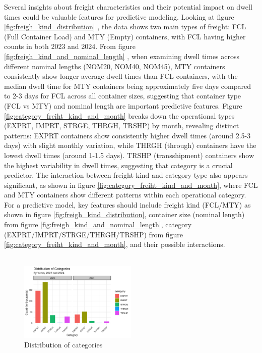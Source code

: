 			Several insights about freight characteristics and their potential impact on dwell times could be valuable
			features for predictive modeling. Looking at figure \ref{fig:freigh_kind_distribution}
			, the data shows two main types of freight: FCL (Full Container Load) and MTY (Empty) containers, with FCL
			having higher counts in both 2023 and 2024.
			From figure \ref{fig:freigh_kind_and_nominal_length}
			, when examining dwell times across different nominal lengths (NOM20, NOM40, NOM45), MTY containers
			consistently show longer average dwell times than FCL containers, with the median dwell time for MTY
			containers being approximately five days compared to 2-3 days for FCL across all container sizes,
			suggesting that container type (FCL vs MTY) and nominal length are important predictive features. Figure
			\ref{fig:category_freiht_kind_and_month} breaks down the operational types (EXPRT,
			IMPRT, STRGE, THRGH, TRSHP) by month, revealing distinct patterns: EXPRT containers show consistently
			higher dwell times (around 2.5-3 days) with slight monthly variation, while THRGH (through) containers
			have the lowest dwell times (around 1-1.5 days). TRSHP (transshipment) containers show the highest
			variability in dwell times, suggesting that category is a crucial predictor. The interaction between
			freight kind and category type also appears significant, as shown in figure
			\ref{fig:category_freiht_kind_and_month}, where FCL and MTY containers show different
			patterns within each operational category. For a predictive model, key features should include freight
			kind (FCL/MTY) as shown in figure \ref{fig:freigh_kind_distribution}, container size (nominal length)
			from figure \ref{fig:freigh_kind_and_nominal_length}, category (EXPRT/IMPRT/STRGE/THRGH/TRSHP) from
			figure \ref{fig:category_freiht_kind_and_month}, and their possible interactions.
			\\
			\\
			\begin{figure}[ht]
				\centering
				\includegraphics[width=0.5\textwidth]{images/du_five}
				\caption{Distribution of categories}
				\label{fig:category_distribution}
			\end{figure}
